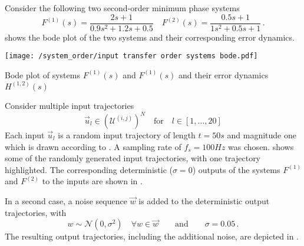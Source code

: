 \begin{example}\label{exapp:input_transfer_order}
Consider the following two second-order minimum phase   systems
\begin{equation}
    F^{(1)}(s) = \frac{2s+1}{0.9s^2+1.2s+0.5} \quad
    F^{(2)}(s) = \frac{0.5s+1}{1s^2+0.5s+1}\,. \label{eqapp:example_order_change}
\end{equation}
 shows the bode plot of the two systems and their corresponding error dynamics.

\begingroup
	\centering
	\vspace{1em}
        \texttt{[image: /system\_order/input transfer order systems bode.pdf]}
        \caption[System Order of Transfer Maps Example (Bode Plot of the Error Dynamics)]{Bode plot of systems $F^{(1)}(s)$ and $F^{(1)}(s)$ and their error dynamics $H^{(1,2)}(s)$}
		\label{figapp:input_tf_order_training_data_bode}
\endgroup

Consider multiple input trajectories 
\begin{equation}
    \vec{u}_l \in (\mathcal{U}^{(i,j)})^N \quad
    \text{for} \quad l \in [1,\ldots,20] 
\end{equation} 
Each input $\vec{u}_l$ is a random input trajectory of length $t=50\unit{s}$ and magnitude one which is drawn according to . A sampling rate of $f_s = 100\unit{Hz}$ was chosen.  shows some of the randomly generated input trajectories, with one trajectory highlighted. The corresponding deterministic ($\sigma = 0$) outputs of the systems $F^{(1)}$ and $F^{(2)}$ to the inputs are shown in .

In a second case, a noise sequence $\vec{w}$ is added to the deterministic output trajectories, with  
\begin{equation}
    w \sim  \mathcal{N}(0,\sigma^2) \quad
    \forall w  \in \vec{w} \qquad \text{and}
    \qquad \sigma = 0.05\,.
\end{equation} 
The resulting output trajectories, including the additional noise, are depicted in .


\end{example}
